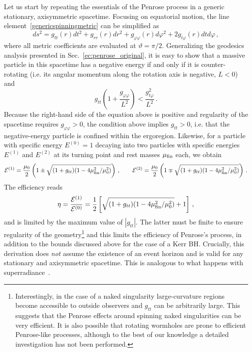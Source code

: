 \documentclass[11pt]{article}
\newcommand{\be}{\begin{equation}}
\newcommand{\ee}{\end{equation}}
\numberwithin{equation}{section} %
\begin{document}
Let us start by repeating the essentials of the Penrose process in a generic stationary, axisymmetric spacetime. Focusing on equatorial motion, the line element~\eqref{genericspinningmetric} can be simplified as 
%
\begin{equation}
 ds^2=g_{tt}(r)dt^2+g_{rr}(r)dr^2+g_{\varphi\varphi}(r) d\varphi^2+2g_{t\varphi}(r)dtd\varphi\,,
\end{equation}
%
where all metric coefficients are evaluated at $\vartheta=\pi/2$. Generalizing the geodesics analysis presented in Sec.~\ref{ec:penrose_original}, it is easy to show that a massive particle in this spacetime has a negative energy if and only if it is counter-rotating (i.e. its angular momentum along the rotation axis is negative, $L<0$) and 
%
\begin{equation}
g_{tt}\left(1+\frac{g_{\varphi\varphi}}{L^2}\right)<\frac{g_{t\varphi}^2}{L^2}\,. \label{ergocondition}
\end{equation}
%
Because the right-hand side of the equation above is positive and regularity of the spacetime requires $g_{\varphi\varphi}>0$, the condition above implies $g_{tt}>0$, i.e. that the negative-energy particle is confined within the ergoregion. Likewise, for a particle with specific energy $E^{(0)}=1$ decaying into two particles with specific energies $E^{(1)}$ and $E^{(2)}$ at its turning point and rest masses $\mu_{\rm fin}$ each, we obtain
%
\be
{\cal E}^{(1)}=\frac{\mu_0}{2}\left(1\pm\sqrt{(1+g_{tt})(1-4\mu_{\rm fin}^2/\mu_{0}^2)}\right)\,,\qquad {\cal E}^{(2)}=\frac{\mu_0}{2}\left(1\mp\sqrt{(1+g_{tt})(1-4\mu_{\rm fin}^2/\mu_{0}^2)}\right)\,.
\ee
%
The efficiency reads
%
\begin{equation}
\eta=\frac{{\cal E}^{(1)}}{{\cal E}^{(0)}}=\frac{1}{2}\left[\sqrt{(1+g_{tt})(1-4\mu_{\rm fin}^2/\mu_{0}^2)}+1\right]\,, 
\label{efficiencyPenrose}
\end{equation}
%
and is limited by the maximum value of $|g_{tt}|$. The latter must be finite to ensure regularity of the geometry\footnote{Interestingly, in the case of a naked singularity large-curvature regions become accessible to outside observers and $g_{tt}$ can be arbitrarily large. This suggests that the Penrose effects around spinning naked singularities can be very efficient. It is also possible that rotating wormholes are prone to
efficient Penrose-like processes, although to the best of our knowledge a detailed investigation has not been performed.} and this limits the efficiency of Penrose's process, in addition to the bounds discussed above for the case of a Kerr BH. Crucially, this derivation does \emph{not} assume the existence of an event horizon and is valid for any stationary and axisymmetric spacetime. This is analogous to what happens with superradiance~\cite{Vicente:2018mxl}.
%
\end{document}
